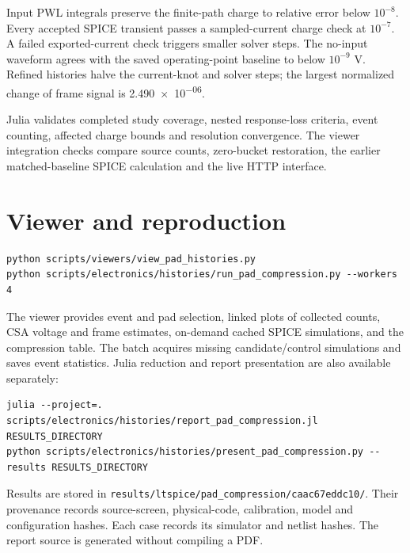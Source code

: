 \documentclass[11pt,a4paper]{article}
\begin{document}
Input PWL integrals preserve the finite-path charge to relative error below
$10^{-8}$. Every accepted SPICE transient passes a sampled-current charge check
at $10^{-7}$. A failed exported-current check triggers smaller solver steps.
The no-input waveform agrees with the saved operating-point baseline to below
$10^{-9}$ V. Refined histories halve the current-knot and solver steps; the
largest normalized change of frame signal is \num{2.490e-06}.

Julia validates completed study coverage, nested response-loss criteria, event
counting, affected charge bounds and resolution convergence. The viewer
integration checks compare source counts, zero-bucket restoration, the earlier
matched-baseline SPICE calculation and the live HTTP interface.

\section{Viewer and reproduction}
\begin{verbatim}
python scripts/viewers/view_pad_histories.py
python scripts/electronics/histories/run_pad_compression.py --workers 4
\end{verbatim}
The viewer provides event and pad selection, linked plots of collected counts,
CSA voltage and frame estimates, on-demand cached SPICE simulations, and the
compression table. The batch acquires missing candidate/control simulations and
saves event statistics. Julia reduction and report presentation are also
available separately:
\begin{verbatim}
julia --project=. scripts/electronics/histories/report_pad_compression.jl RESULTS_DIRECTORY
python scripts/electronics/histories/present_pad_compression.py --results RESULTS_DIRECTORY
\end{verbatim}
Results are stored in \texttt{results/ltspice/pad\_compression/caac67eddc10/}.
Their provenance records source-screen, physical-code, calibration, model and
configuration hashes. Each case records its simulator and netlist hashes.
The report source is generated without compiling a PDF.
\end{document}
